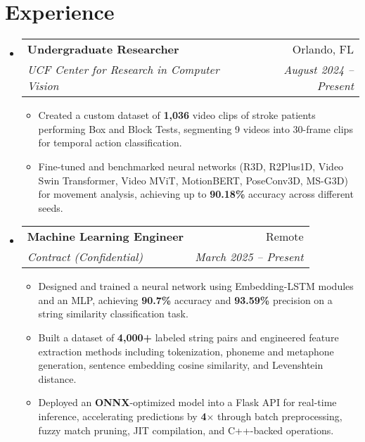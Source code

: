\documentclass[letterpaper,11pt]{article}
\makeatletter
\newcommand{\resumeItem}[1]{
  \item\small{
    {#1 \vspace{-2pt}}
  }
}
\newcommand{\resumeSubheading}[4]{
  \vspace{-2pt}\item
    \begin{tabular*}{0.97\textwidth}[t]{l@{\extracolsep{\fill}}r}
      \textbf{#1} & #2 \\
      \textit{\small#3} & \textit{\small #4} \\
    \end{tabular*}\vspace{-7pt}
}
\newcommand{\resumeSubHeadingListStart}{\begin{itemize}[leftmargin=0.15in, label={}]}
\newcommand{\resumeSubHeadingListEnd}{\end{itemize}}
\newcommand{\resumeItemListStart}{\begin{itemize}}
\newcommand{\resumeItemListEnd}{\end{itemize}\vspace{-5pt}}
\makeatother
\begin{document}
\section{Experience}
  \resumeSubHeadingListStart
  \resumeSubheading
    {Undergraduate Researcher}{Orlando, FL}
    {UCF Center for Research in Computer Vision}{August 2024 -- Present}
    \resumeItemListStart
      \resumeItem{Created a custom dataset of \textbf{1,036} video clips of stroke patients performing Box and Block Tests, segmenting 9 videos into 30-frame clips for temporal action classification.}
      \resumeItem{Fine-tuned and benchmarked neural networks (R3D, R2Plus1D, Video Swin Transformer, Video MViT, MotionBERT, PoseConv3D, MS-G3D) for movement analysis, achieving up to \textbf{90.18\%} accuracy across different seeds.}
    \resumeItemListEnd
    \resumeSubheading
      {Machine Learning Engineer}{Remote}
      {Contract (Confidential)}{March 2025 -- Present}
      \resumeItemListStart
        \resumeItem{Designed and trained a neural network using Embedding-LSTM modules and an MLP, achieving \textbf{90.7\%} accuracy and \textbf{93.59\%} precision on a string similarity classification task.}
        \resumeItem{Built a dataset of \textbf{4,000+} labeled string pairs and engineered feature extraction methods including tokenization, phoneme and metaphone generation, sentence embedding cosine similarity, and Levenshtein distance.}
        \resumeItem{Deployed an \textbf{ONNX}-optimized model into a Flask API for real-time inference, accelerating predictions by \textbf{4$\times$} through batch preprocessing, fuzzy match pruning, JIT compilation, and C++-backed operations.}
      \resumeItemListEnd
  \resumeSubHeadingListEnd
\end{document}
